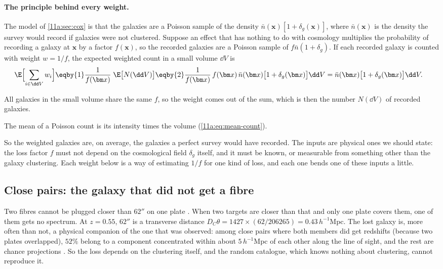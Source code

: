 \paragraph{The principle behind every weight.}
The model of \cref{11a:sec:cox} is that the galaxies are a Poisson sample of the
density $\bar n(\bm x)[1+\delta_g(\bm x)]$, where $\bar n(\bm x)$ is the density the
survey would record if galaxies were not clustered. Suppose an effect that has
nothing to do with cosmology multiplies the probability of recording a galaxy at
$\bm x$ by a factor $f(\bm x)$, so the recorded galaxies are a Poisson sample of
$f\bar n(1+\delta_g)$. If each recorded galaxy is counted with weight $w=1/f$, the
expected weighted count in a small volume $\dd V$ is
\begin{align}
  \E\Bigl[\sum_{i\in\dd V}w_i\Bigr]
  &\eqby{1}\frac{1}{f(\bm x)}\;\E\bigl[N(\dd V)\bigr]
   \eqby{2}\frac{1}{f(\bm x)}\,f(\bm x)\,\bar n(\bm x)\bigl[1+\delta_g(\bm x)\bigr]\dd V
   =\bar n(\bm x)\bigl[1+\delta_g(\bm x)\bigr]\dd V .
  \label{13c:eq:weight-principle}
\end{align}
\begin{explain}
  \item All galaxies in the small volume share the same $f$, so the weight comes
        out of the sum, which is then the number $N(\dd V)$ of recorded galaxies.
  \item The mean of a Poisson count is its intensity times the volume
        (\cref{11a:eq:mean-count}).
\end{explain}
So the weighted galaxies are, on average, the galaxies a perfect survey would have
recorded. The inputs are physical ones we should state: the loss factor $f$ must
not depend on the cosmological field $\delta_g$ itself, and it must be known, or
measurable from something other than the galaxy clustering. Each weight below is
a way of estimating $1/f$ for one kind of loss, and each one bends one of these
inputs a little.

\subsection{Close pairs: the galaxy that did not get a fibre}
\label{13c:sec:wcp}

Two fibres cannot be plugged closer than $62''$ on one plate .
When two targets are closer than that and only one plate covers them, one of them
gets no spectrum. At $z=0.55$, $62''$ is a transverse distance
$D_C\theta=1427\times(62/206265)=0.43\,h^{-1}$Mpc. The lost galaxy is, more often than
not, a physical companion of the one that was observed: among close pairs where both
members did get redshifts (because two plates overlapped), $52\%$ belong to a
component concentrated within about $5\,h^{-1}$Mpc of each other along the line of
sight, and the rest are chance projections . So the loss depends on the clustering itself,
and the random catalogue, which knows nothing about clustering, cannot reproduce it.

